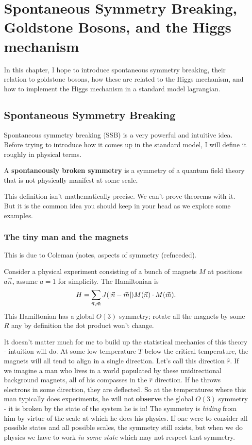 \documentclass[main.tex]{subfiles}
\begin{document}
\chapter{Spontaneous Symmetry Breaking, Goldstone Bosons, and the Higgs mechanism}
In this chapter, I hope to introduce spontaneous symmetry breaking, their relation to goldstone bosons, how these are related to the Higgs mechanism, and how to implement the Higgs mechanism in a standard model lagrangian.

\section{Spontaneous Symmetry Breaking}
Spontaneous symmetry breaking (SSB) is a very powerful and intuitive idea. Before trying to introduce how it comes up in the standard model, I will define it roughly in physical terms.

\begin{defn} \label{ssb1}
A \textbf{spontaneously broken symmetry} is a symmetry of a quantum field theory that is not physically manifest at some scale.
\end{defn}
This definition isn't mathematically precise. We can't prove theorems with it. But it is the common idea you should keep in your head as we explore some examples.

\subsection{The tiny man and the magnets}
This is due to Coleman (notes, aspects of symmetry (refneeded).

Consider a physical experiment consisting of a bunch of magnets $M$ at positions $a\vec{n}$, assume $a=1$ for simplicity. The Hamiltonian is
\[
H = \sum_{\vec{n},\vec{m}} J(\abs{\vec{n} - \vec{m}}) M(\vec{n}) \cdot M(\vec{m}).
\]
This Hamiltonian has a global $O(3)$ symmetry; rotate all the magnets by some $R$ any by definition the dot product won't change.

It doesn't matter much for me to build up the statistical mechanics of this theory - intuition will do. At some low temperature $T$ below the critical temperature, the magnets will all tend to align in a single direction. Let's call this direction $\hat{r}$. If we imagine a man who lives in a world populated by these unidirectional background magnets, all of his compasses in the $\hat{r}$ direction. If he throws electrons in some direction, they are deflected. So at the temperatures where this man typically does experiments, he will not \textbf{observe} the global $O(3)$ symmetry - it is broken by the state of the system he is in! The symmetry is \textit{hiding} from him by virtue of the scale at which he does his physics. If one were to consider all possible states and all possible scales, the symmetry still exists, but when we do physics we have to work \textit{in some state} which may not respect that symmetry.
\end{document}
